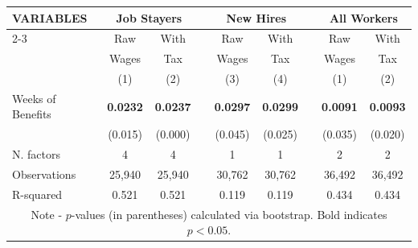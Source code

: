 \begin{tabular}{lcccccccc} \hline
    VARIABLES & \multicolumn{2}{c}{Job Stayers} &&  \multicolumn{2}{c}{New Hires} &&  \multicolumn{2}{c}{All Workers}\\ \cline{2-3} \cline{5-6} \cline{8-9}
    				  & Raw    & With && Raw   & With && Raw   & With\\
    				  & Wages  & Tax  && Wages & Tax  && Wages & Tax\\
    				  & (1) & (2) && (3) & (4) && (1) & (2)\\ \hline \noalign{\vskip 1mm}
Weeks of  Benefits & \bf{0.0232} & \bf{0.0237} && \bf{0.0297} & \bf{0.0299} &&  \bf{0.0091} & \bf{0.0093}\\
									 & (0.015)	  & (0.000)	 	 &&  (0.045)   	& (0.025)    && (0.035)	& (0.020)\\ \noalign{\vskip 1mm}

N. factors   & 4 & 4 && 1 & 1 && 2 & 2  \\
Observations & 25,940 & 25,940 && 30,762 & 30,762 && 36,492 & 36,492  \\
R-squared    & 0.521 & 0.521 && 0.119 & 0.119 && 0.434 & 0.434  \\  \hline
\multicolumn{9}{c}{\footnotesize Note - $p$-values (in parentheses) calculated via bootstrap. Bold indicates $p<0.05$.} \\
\end{tabular}
